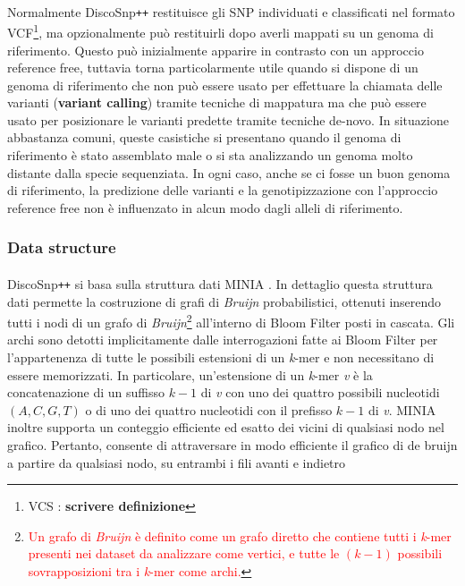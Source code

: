 \documentclass[../main.tex]{subfiles}
\begin{document}
\paragraph{}  Normalmente DiscoSnp\texttt{++} restituisce gli SNP individuati e classificati nel formato VCF\footnote{VCS : \textbf{scrivere definizione}}, ma opzionalmente può restituirli dopo averli mappati su un genoma di riferimento. Questo può inizialmente apparire in contrasto con un approccio reference free, tuttavia torna particolarmente utile quando si dispone di un genoma di riferimento che non può essere usato per effettuare la chiamata delle varianti (\textbf{variant calling}) tramite tecniche di mappatura ma che può essere usato per posizionare le varianti predette tramite tecniche de-novo. In situazione abbastanza comuni, queste casistiche si presentano quando il genoma di riferimento è stato assemblato male o si sta analizzando un genoma molto distante dalla specie sequenziata. In ogni caso, anche se ci fosse un buon genoma di riferimento, la predizione delle varianti e la genotipizzazione con l'approccio reference free non è influenzato in alcun modo dagli alleli di riferimento.

\subsubsection{Data structure}

\paragraph{}
DiscoSnp\texttt{++} si basa sulla struttura dati \textsc{MINIA} \cite{chikhi2013space}. In dettaglio questa struttura dati permette la costruzione di grafi di \textit{Bruijn} probabilistici, ottenuti inserendo tutti i nodi di un grafo di \textit{Bruijn}\footnote{\textcolor{red}{Un grafo di \textit{Bruijn} è definito come un grafo diretto che contiene tutti i \textit{k}-mer presenti nei dataset da analizzare come vertici, e tutte le $(\textit{k}-1)$ possibili sovrapposizioni tra i \textit{k}-mer come archi.}} all'interno di Bloom Filter posti in cascata. Gli archi sono detotti implicitamente dalle interrogazioni fatte ai Bloom Filter per l'appartenenza di tutte le possibili estensioni di un \textit{k}-mer e non necessitano di essere memorizzati. In particolare, un'estensione di un \textit{k}-mer \textit{v} è la concatenazione di un suffisso $\textit{k}-1$ di \textit{v} con uno dei quattro possibili nucleotidi $(A,C,G,T)$ o di uno dei quattro nucleotidi con il prefisso  $\textit{k}-1$ di \textit{v}.
\textsc{MINIA} inoltre supporta un conteggio efficiente ed esatto dei vicini di qualsiasi nodo nel grafico. Pertanto, consente di attraversare in modo efficiente il grafico di de bruijn a partire da qualsiasi nodo, su entrambi i fili avanti e indietro
\end{document}
